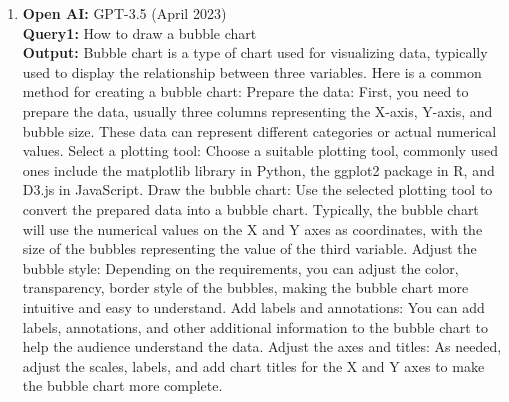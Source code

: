 \documentclass{mcmthesis}
\begin{document}
\begin{appendices}
\begin{enumerate}
          Select a plotting tool: Choose a suitable plotting tool. Common options include the matplotlib library in Python, the ggplot2 package in R, and D3.js in JavaScript.
          Draw the heatmap: Use the selected plotting tool to transform the data into a heatmap. Generally, the function for drawing a heatmap will take the data matrix as input and choose colors based on the size of the values. Typically, cells with larger values will have darker colors, while cells with smaller values will have lighter colors.
          Add labels and annotations: You can add row labels, column labels, and other annotations to the heatmap to help the audience understand the meaning of the data.
          Adjust colors and scales: Depending on the requirements, adjust the color mapping and the scale of the values to make the heatmap more intuitive and easy to understand.
          The method for creating a heatmap varies depending on the tool used, but typically follows the basic steps outlined above. I hope these steps will help you create a clear and easy-to-understand heatmap.
    \item \textbf{Open AI:} GPT-3.5 (April 2023)\\
          \textbf{Query1:} How to draw a bubble chart\\
          \textbf{Output:} Bubble chart is a type of chart used for visualizing data, typically used to display the relationship between three variables. Here is a common method for creating a bubble chart:
          Prepare the data: First, you need to prepare the data, usually three columns representing the X-axis, Y-axis, and bubble size. These data can represent different categories or actual numerical values.
          Select a plotting tool: Choose a suitable plotting tool, commonly used ones include the matplotlib library in Python, the ggplot2 package in R, and D3.js in JavaScript.
          Draw the bubble chart: Use the selected plotting tool to convert the prepared data into a bubble chart. Typically, the bubble chart will use the numerical values on the X and Y axes as coordinates, with the size of the bubbles representing the value of the third variable.
          Adjust the bubble style: Depending on the requirements, you can adjust the color, transparency, border style of the bubbles, making the bubble chart more intuitive and easy to understand.
          Add labels and annotations: You can add labels, annotations, and other additional information to the bubble chart to help the audience understand the data.
          Adjust the axes and titles: As needed, adjust the scales, labels, and add chart titles for the X and Y axes to make the bubble chart more complete.

\end{enumerate}
\end{appendices}
\end{document}
